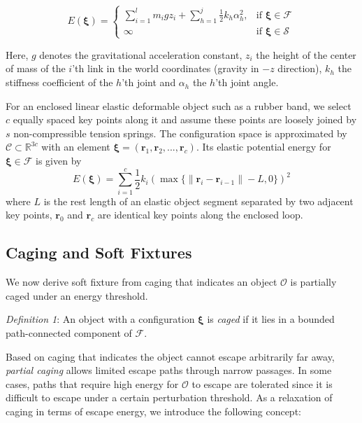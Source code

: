 \documentclass[conference]{IEEEtran}
\newcommand{\bxi}{\boldsymbol{\xi}}
\begin{document}
\begin{equation} \label{eq1}
	E(\boldsymbol{\xi}) = 
	\begin{cases}
		\sum_{i=1}^{l} m_i g z_i +\sum_{h=1}^{j} \frac{1}{2} k_h {\alpha}_{h}^2, & \text{if }\boldsymbol{\xi}\in \mathcal{F}\\
		\infty & \text{if }\boldsymbol{\xi}\in \mathcal{S}
	\end{cases}
\end{equation}

Here, $g$ denotes the gravitational acceleration constant, $z_i$ the height of the center of mass of the $i$'th link in the world coordinates (gravity in $-z$ direction), $k_h$ the stiffness coefficient of the $h$'th joint and ${\alpha}_{h}$ the $h$'th joint angle. 

For an enclosed linear elastic deformable object such as a rubber band, we select $c$ equally spaced key points along it and assume these points are loosely joined by $s$ non-compressible tension springs.
The configuration space is approximated by $\mathcal{C}\subset \mathbb{R}^{3c}$ with an element $\boldsymbol{\xi}=(\boldsymbol{r}_1, \boldsymbol{r}_2, ..., \boldsymbol{r}_c)$. 
Its elastic potential energy for $\boldsymbol{\xi}\in \mathcal{F}$ is given by
\begin{equation} \label{eq2}
	E(\boldsymbol{\xi}) = 
	\sum_{i=1}^{c} \frac{1}{2} k_i (\max\{\|{\boldsymbol{r}_i}-{\boldsymbol{r}_{i-1}}\|-L, 0\})^2
\end{equation}
where $L$ is the rest length of an elastic object segment separated by two adjacent key points, ${\boldsymbol{r}_0}$ and ${\boldsymbol{r}_c}$ are identical key points along the enclosed loop.

\subsection{Caging and Soft Fixtures}
We now derive soft fixture from caging that indicates an object $\mathcal{O}$ is partially caged under an energy threshold. 

\textit{Definition 1}: An object with a configuration $\bxi$ is \textit{caged} if it lies in a bounded path-connected component of $\mathcal{F}$. 

Based on caging that indicates the object cannot escape arbitrarily far away, \textit{partial caging} allows limited escape paths through narrow passages.
In some cases, paths that require high energy for $\mathcal{O}$ to escape are tolerated since it is difficult to escape under a certain perturbation threshold. 
As a relaxation of caging in terms of escape energy, we introduce the following concept:
\end{document}

